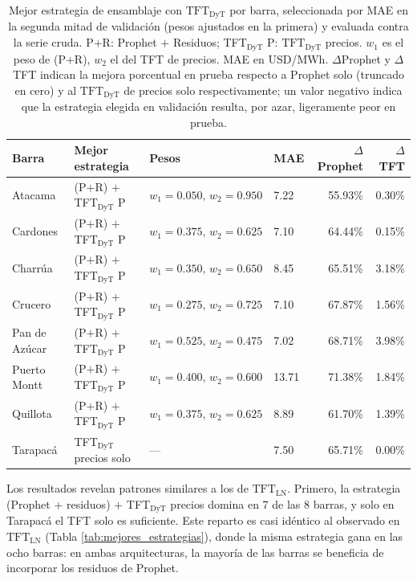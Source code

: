 \begin{table}[htbp]
    \centering
    \small
    \begin{tabular}{llllrr}
        \toprule
        Barra & Mejor estrategia & Pesos & MAE & $\Delta$Prophet & $\Delta$TFT \\
        \midrule
        Atacama        & (P$+$R) $+$ TFT$_\text{DyT}$ P & $w_1{=}0.050,\,w_2{=}0.950$ & 7.22  & 55.93\% & 0.30\% \\
        Cardones       & (P$+$R) $+$ TFT$_\text{DyT}$ P & $w_1{=}0.375,\,w_2{=}0.625$ & 7.10  & 64.44\% & 0.15\% \\
        Charrúa        & (P$+$R) $+$ TFT$_\text{DyT}$ P & $w_1{=}0.350,\,w_2{=}0.650$ & 8.45  & 65.51\% & 3.18\% \\
        Crucero        & (P$+$R) $+$ TFT$_\text{DyT}$ P & $w_1{=}0.275,\,w_2{=}0.725$ & 7.10  & 67.87\% & 1.56\% \\
        Pan de Azúcar  & (P$+$R) $+$ TFT$_\text{DyT}$ P & $w_1{=}0.525,\,w_2{=}0.475$ & 7.02  & 68.71\% & 3.98\% \\
        Puerto Montt   & (P$+$R) $+$ TFT$_\text{DyT}$ P & $w_1{=}0.400,\,w_2{=}0.600$ & 13.71  & 71.38\% & 1.84\% \\
        Quillota       & (P$+$R) $+$ TFT$_\text{DyT}$ P & $w_1{=}0.375,\,w_2{=}0.625$ & 8.89  & 61.70\% & 1.39\% \\
        Tarapacá       & TFT$_\text{DyT}$ precios solo & ---                         & 7.50  & 65.71\% & 0.00\% \\
        \bottomrule
    \end{tabular}
    \vspace{0.2cm}
    \caption{Mejor estrategia de ensamblaje con $\text{TFT}_\text{DyT}$ por barra, seleccionada por MAE en la segunda mitad de validación (pesos ajustados en la primera) y evaluada contra la serie cruda. P$+$R: Prophet $+$ Residuos; TFT$_\text{DyT}$ P: $\text{TFT}_\text{DyT}$ precios. $w_1$ es el peso de (P$+$R), $w_2$ el del TFT de precios. MAE en USD/MWh. $\Delta$Prophet y $\Delta$TFT indican la mejora porcentual en prueba respecto a Prophet solo (truncado en cero) y al $\text{TFT}_\text{DyT}$ de precios solo respectivamente; un valor negativo indica que la estrategia elegida en validación resulta, por azar, ligeramente peor en prueba.}
    \label{tab:stacking_dyt_mejores}
\end{table}

Los resultados revelan patrones similares a los de $\text{TFT}_\text{LN}$. Primero, la estrategia (Prophet $+$ residuos) $+$ TFT$_\text{DyT}$ precios domina en 7 de las 8 barras, y solo en Tarapacá el TFT solo es suficiente. Este reparto es casi idéntico al observado en $\text{TFT}_\text{LN}$ (Tabla \ref{tab:mejores_estrategias}), donde la misma estrategia gana en las ocho barras: en ambas arquitecturas, la mayoría de las barras se beneficia de incorporar los residuos de Prophet.

